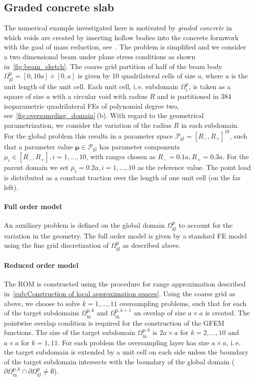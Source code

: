\documentclass[a4paper]{eccomas_paper-2024}
\makeatletter
\newcommand{\ie}{i.\,e.\@\xspace}
\newcommand{\m}{\bm\mu}
\newcommand{\gl}{\mathrm{gl}}
\newcommand{\p}{\mathrm{p}}
\newcommand{\inrm}{\mathrm{in}}
\makeatother
\begin{document}

\subsection{Graded concrete slab} %
\label{sub:Graded concrete slab}
The numerical example investigated here is motivated by \textit{graded concrete} in which voids are created by inserting hollow bodies into the concrete formwork with the goal of mass reduction, see~\gradientenbetonurl.
The problem is simplified and we consider a two dimensional beam under plane stress conditions as shown in~\cref{fig:beam_sketch}.
The coarse grid partition of half of the beam body $\varOmega^{\p}_{\gl}=[0, 10a]\times[0, a]$ is given by $10$ quadrilateral cells of size $a$, where $a$ is the unit length of the unit cell.
Each unit cell, \ie{} subdomain $\varOmega^{\p}_i$, is taken as a square of size $a$ with a circular void with radius $R$ and is partitioned in 384 isoparametric quadrilateral FEs of polynomial degree two, see~\cref{fig:oversampling_domain}\,(b).
With regard to the geometrical parametrization, we consider the variation of the radius $R$ in each subdomain.
For the global problem this results in a parameter space $\mathcal{P}_{\gl}=[R_{-}, R_{+}]^{10}$, such that a parameter value $\m\in\mathcal{P}_{\gl}$ has parameter components $\mu_i\in[R_{-},R_{+}], i=1, \ldots, 10$, with ranges chosen as $R_{-}=0.1a, R_{+}=0.3a$.
For the parent domain we set $\bar{\mu}_i=0.2a, i=1, \ldots, 10$ as the reference value.
The point load is distributed as a constant traction over the length of one unit cell (on the far left).

\paragraph{Full order model}
An auxiliary problem is defined on the global domain $\varOmega^{\p}_{\gl}$ to account for the variation in the geometry.
The full order model is given by a standard FE model using the fine grid discretization of $\varOmega^{\p}_{\gl}$ as described above.

\paragraph{Reduced order model}
The ROM is constructed using the procedure for range approximation described in~\cref{sub:Construction of local approximation spaces}.
Using the coarse grid as above, we choose to solve $k=1, \ldots, 11$ oversampling problems, such that for each of the target subdomains $\varOmega^{\p, k}_{\inrm}$ and $\varOmega^{\p, k+1}_{\inrm}$ an overlap of size $a\times a$ is created.
The pointwise overlap condition is required for the construction of the GFEM functions.
The size of the target subdomain $\varOmega^{\p, k}_{\inrm}$ is $2a \times a$ for $k=2, \ldots, 10$ and $a \times a$ for $k = 1, 11$.
For each problem the oversampling layer has size $a \times a$, \ie{} the target subdomain is extended by a unit cell on each side unless the boundary of the target subdomain intersects with the boundary of the global domain ($\partial\varOmega^{\p,k}_{\inrm}\cap\partial\varOmega^{\p}_{\gl}\ne\emptyset$).
\end{document}
